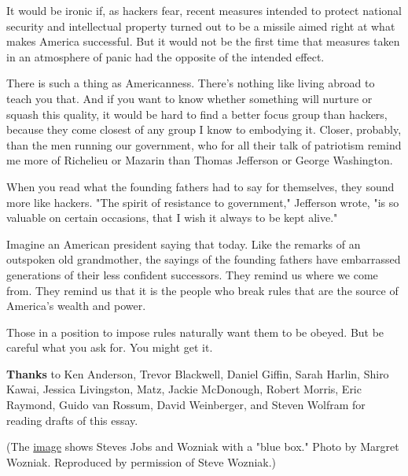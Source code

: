 It
                  would be ironic if, as hackers fear, recent measures intended
                  to protect national security and intellectual property turned
                  out to be a missile aimed right at what makes America
                  successful. But it would not be the first time that measures
                  taken in an atmosphere of panic had the opposite of the
                  intended effect.

There is such a thing as
                  Americanness. There's nothing like living abroad to teach you
                  that. And if you want to know whether something will nurture
                  or squash this quality, it would be hard to find a better
                  focus group than hackers, because they come closest of any
                  group I know to embodying it. Closer, probably, than the men
                  running our government, who for all their talk of patriotism
                  remind me more of Richelieu or Mazarin than Thomas Jefferson
                  or George Washington.

When you read what the
                  founding fathers had to say for themselves, they sound more
                  like hackers. "The spirit of resistance to government,"
                  Jefferson wrote, "is so valuable on certain occasions, that I
                  wish it always to be kept alive."

Imagine an
                  American president saying that today. Like the remarks of an
                  outspoken old grandmother, the sayings of the founding fathers
                  have embarrassed generations of their less confident
                  successors. They remind us where we come from. They remind us
                  that it is the people who break rules that are the source of
                  America's wealth and power.

Those in a position to
                  impose rules naturally want them to be obeyed. But be careful
                  what you ask for. You might get it.





\textbf{Thanks}
                  to Ken Anderson, Trevor Blackwell, Daniel Giffin, Sarah
                  Harlin, Shiro Kawai, Jessica Livingston, Matz, Jackie
                  McDonough, Robert Morris, Eric Raymond, Guido van Rossum,
                  David Weinberger, and Steven Wolfram for reading drafts of
                  this essay.
                  

(The
                  \href{http://www.paulgraham.com/bluebox.html}{image} shows Steves Jobs and Wozniak
                  with a "blue box." Photo by Margret Wozniak. Reproduced by
                  permission of Steve Wozniak.)



              
            
          
